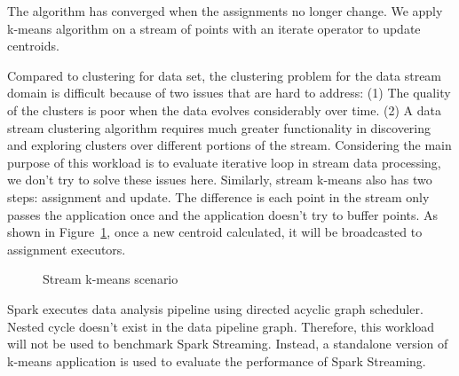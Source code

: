 The algorithm has converged when the assignments no longer change. We apply k-means algorithm on a stream of points with an iterate operator to update centroids.

Compared to clustering for data set, the clustering problem for the data stream domain is difficult because of two issues that are hard to address: (1) The quality of the clusters is poor when the data evolves considerably over time. (2) A data stream clustering algorithm requires much greater functionality in discovering and exploring clusters over different portions of the stream\cite{aggarwal2003framework}. Considering the main purpose of this workload is to evaluate iterative loop in stream data processing, we don't try to solve these issues here. Similarly, stream k-means also has two steps: assignment and update. The difference is each point in the stream only passes the application once and the application doesn't try to buffer points. As shown in Figure~\ref{fig:iterator_operator}, once a new centroid calculated, it will be broadcasted to assignment executors. 

 \begin{figure}
  \begin{center}
   \caption{Stream k-means scenario}
   \label{fig:iterator_operator}
  \end{center}
\end{figure}

Spark executes data analysis pipeline using directed acyclic graph scheduler.  Nested cycle doesn't exist in the data pipeline graph. Therefore, this workload will not be used to benchmark Spark Streaming. Instead, a standalone version of k-means application is used to evaluate the performance of Spark Streaming.

